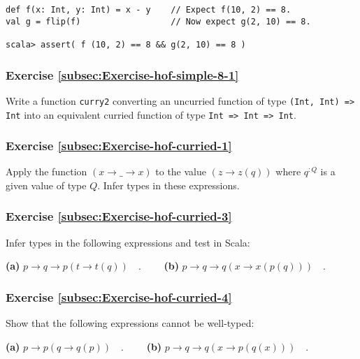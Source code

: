\begin{lstlisting}
def f(x: Int, y: Int) = x - y    // Expect f(10, 2) == 8.
val g = flip(f)                  // Now expect g(2, 10) == 8.

scala> assert( f (10, 2) == 8 && g(2, 10) == 8 )
\end{lstlisting}


\subsubsection{Exercise \label{subsec:Exercise-hof-simple-8-1}\ref{subsec:Exercise-hof-simple-8-1}}

Write a function \lstinline!curry2! converting an uncurried function
of type \texttt{}\lstinline!(Int, Int) => Int! into an equivalent
curried function of type \texttt{}\lstinline!Int => Int => Int!.

\subsubsection{Exercise \label{subsec:Exercise-hof-curried-1}\ref{subsec:Exercise-hof-curried-1}}

Apply the function $\left(x\rightarrow\_\rightarrow x\right)$ to
the value $\left(z\rightarrow z(q)\right)$ where $q^{:Q}$ is a given
value of type $Q$. Infer types in these expressions.

\subsubsection{Exercise \label{subsec:Exercise-hof-curried-3}\ref{subsec:Exercise-hof-curried-3}}

Infer types in the following expressions and test in Scala:

\textbf{(a)} $p\rightarrow q\rightarrow p(t\rightarrow t(q))\quad.\quad\quad$
\textbf{(b)} $p\rightarrow q\rightarrow q(x\rightarrow x(p(q)))\quad.$

\subsubsection{Exercise \label{subsec:Exercise-hof-curried-4}\ref{subsec:Exercise-hof-curried-4}}

Show that the following expressions cannot be well-typed:

\textbf{(a)} $p\rightarrow p(q\rightarrow q(p))\quad.\quad\quad$\textbf{
(b)} $p\rightarrow q\rightarrow q(x\rightarrow p(q(x)))\quad.$

